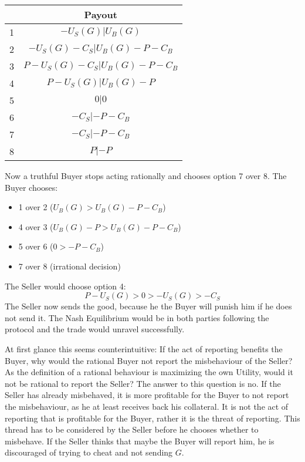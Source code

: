 \documentclass{cacthesis}
\begin{document}
\begin{center}
\begin{tabular}{ |c|c| }
\hline
& Payout  \\
\hline
\hline
1& $-U_S(G) | U_B(G)$\\
\hline
2& $-U_S(G) - C_S| U_B(G)- P - C_B $\\
\hline
3&$P-U_S(G) - C_S | U_B(G) -P - C_B$ \\
\hline
4& $P-U_S(G)| U_B(G)-P$\\
\hline
5& $0|0$\\
\hline 
6& $-C_S |-P - C_B$\\
\hline
7& $- C_S| -P-C_B$\\
\hline
8& $P| -P$\\
\hline
\end{tabular}
\end{center}
Now a truthful Buyer stops acting rationally and chooses option 7 over 8.\newline
The Buyer chooses:
\begin{itemize}
    \item 1 over 2 ($U_B(G) > U_B(G) -P -C_B$)
    \item 4 over 3 ($U_B(G) - P > U_B(G) -P -C_B$)
    \item 5 over 6 ($0 > -P -C_B$)
    \item 7 over 8 (irrational decision)
\end{itemize}
The Seller would choose option 4:
\[P-U_S(G)>0>-U_S(G)>-C_S\]
The Seller now sends the good, because he the Buyer will punish him if he does not send it.
The Nash Equilibrium would be in both parties following the protocol and the trade would unravel successfully.\newline

At first glance this seems counterintuitive: If the act of reporting benefits the Buyer, why would the rational Buyer not report the misbehaviour of the Seller? As the definition of a rational behaviour is maximizing the own Utility, would it not be rational to report the Seller?
The answer to this question is no. If the Seller has already misbehaved, it is more profitable for the Buyer to not report the misbehaviour, as he at least receives back his collateral.
It is not the act of reporting that is profitable for the Buyer, rather it is
the threat of reporting. This thread has to be considered by the Seller before he chooses whether to misbehave. If the Seller thinks that maybe the Buyer will report him, he is discouraged of trying to cheat and not sending $G$.\newline
\end{document}
